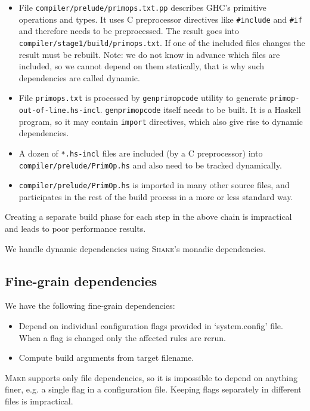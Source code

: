 \begin{itemize}
  \item File \texttt{compiler/prelude/primops.txt.pp} describes GHC’s primitive
  operations and types. It uses C preprocessor directives like
  \texttt{\#include} and \texttt{\#if} and therefore needs to be preprocessed.
  The result goes into \texttt{compiler/stage1/build/primops.txt}. If one of the
  included files changes the result must be rebuilt. Note: we do not know in
  advance which files are included, so we cannot depend on them statically,
  that is why such dependencies are called dynamic.
  \item File \texttt{primops.txt} is processed by \texttt{genprimopcode} utility
  to generate \texttt{primop-out-of-line.hs-incl}. \texttt{genprimopcode} itself
  needs to be built. It is a Haskell program, so it may contain \texttt{import}
  directives, which also give rise to dynamic dependencies.
  \item A dozen of \texttt{*.hs-incl} files are included (by a C preprocessor)
  into \texttt{compiler/prelude/PrimOp.hs} and also need to be tracked
  dynamically.
  \item \texttt{compiler/prelude/PrimOp.hs} is imported in many other source
  files, and participates in the rest of the build process in a more or less
  standard way.
\end{itemize}

\noindent Creating a separate build phase for each step in the above chain is
impractical and leads to poor performance results.

We handle dynamic dependencies using \textsc{Shake}'s monadic dependencies.

\subsection{Fine-grain dependencies}

We have the following fine-grain dependencies:
\begin{itemize}
  \item Depend on individual configuration flags provided in `system.config'
  file. When a flag is changed only the affected rules are rerun.
  \item Compute build arguments from target filename.
\end{itemize}

\textsc{Make} supports only file dependencies, so it is impossible to depend
on anything finer, e.g. a single flag in a configuration file. Keeping flags
separately in different files is impractical.

